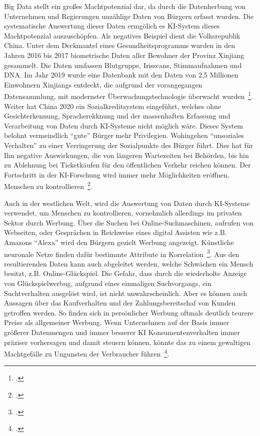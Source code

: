 Big Data stellt ein großes Machtpotenzial dar, da durch die Datenherbung von Unternehmen und Regierungen unzählige Daten von Bürgern erfasst wurden. Die systematische 
Auswertung dieser Daten ermgölich es \ac{KI}-System dieses Machtpotenzial auszuschöpfen.
Als negatives Beispiel dient die Volksrepublik China. Unter dem Deckmantel eines Gesundheitsprogramms wurden in den Jahren 2016 bis 2017 biometrische Daten aller
Bewohner der Provinz Xinjiang gesammelt. Die Daten umfassen Blutgruppe, Irisscans, Stimmaufnahmen und DNA. Im Jahr 2019 wurde eine Datenbank mit den Daten von 2,5 Millionen
Einwohnern Xinjiangs entdeckt, die aufgrund der vorangegangen Datensammlung, mit modernster Überwachungstechnologie überwacht wurden~\footcite[\vglf][]{Kipper.2020}.
Weiter hat China 2020 ein Sozialkreditsystem eingeführt, welches ohne Gesichterkennung, Spracherekknung und der massenhaften Erfassung und Verarbeitung von Daten durch
\ac{KI}-Systeme nicht möglich wäre. Dieses System belohnt vermeindlich \enquote{gute} Bürger mehr Privilegien. Wohingehen \enquote{unsoziales Verhalten} zu einer Verringerung der
Sozialpunkte des Bürger führt. Dies hat für Ihn negative Auswirkungen, die von längeren Wartezeiten bei Behörden, bis hin zu Ablehnung bei Ticketkäufen für den öffentlichen Verkehr
reichen können. Der Fortschritt in der \ac{KI}-Forschung wird immer mehr Möglichkeiten eröffnen, Menschen zu kontrollieren~\footcite[\vglf][]{Kipper.2020}.

Auch in der westlichen Welt, wird die Auswertung von Daten durch \ac{KI}-Systeme verwendet, um Menschen zu kontrollieren, vornehmlich allerdings im privaten Sektor durch Werbung.
Über die Suchen bei Online-Suchmaschinen, aufrufen von Webseiten, oder Gesprächen in Reichweise eines digital Assisten wie z.B. Amazons \enquote{Alexa} wird den Bürgern
gezielt Werbung angezeigt. Künstliche neuronale Netze finden dafür bestimmte Attribute in Korrelation~\footcite[\vglf][]{Kipper.2020}.
Aus den resultierenden Daten kann auch abgeleitet werden, welche Schwächen ein Mensch besitzt, z.B. Online-Glückspiel. Die Gefahr, dass durch die wiederholte Anzeige von 
Glückspielwerbug, aufgrund eines einmaligen Suchvorgangs, ein Suchtverhalten ausgelöst wird, ist nicht unwahrscheinlich.
Aber es können auch Aussagen über das Kaufverhalten und der Zahlungsbereitschaf von Kunden getroffen werden. So finden sich in persönlicher Werbung oftmals deutlich
teurere Preise als allgemeiner Werbung.
Wenn Unternehmen auf der Basis immer größerer Datenmengen und immer besserer KI Konsumentenverhalten immer präziser vorhersagen und damit steuern können, 
könnte das zu einem gewaltigen Machtgefälle zu Ungunsten der Verbraucher führen~\footcite[\vglf][]{Kipper.2020}.


